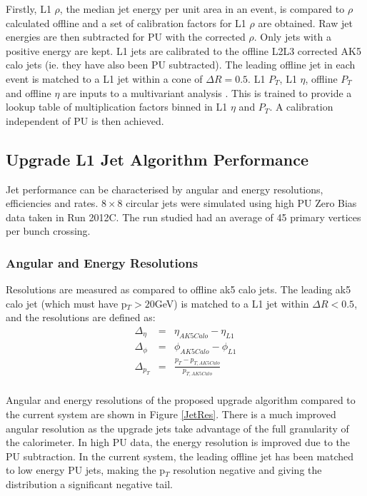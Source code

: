 \begin{itemize}
Firstly, L1 $\rho$, the median jet energy per unit area in an event, is compared to $\rho$ calculated offline 
  and a set of calibration factors for L1 $\rho$ are obtained.
Raw jet energies are then subtracted for PU with the corrected $\rho$. 
Only jets with a positive energy are kept. 
L1 jets are calibrated to the offline L2L3 corrected AK5 calo jets
(ie. they have also been PU subtracted).
The leading offline jet in each event is matched to a L1 jet within a cone of $\Delta R = 0.5$.
L1 $P_{T}$, L1 $\eta$, offline $P_{T}$ and offline $\eta$ are inputs to a multivariant analysis \cite{2007physics...3039H}. 
 This is trained to provide a lookup table of multiplication factors binned in L1 $\eta$ and $P_{T}$. 
 A calibration independent of PU is then achieved. 

\end{itemize}


\subsection{\sc Upgrade L1 Jet Algorithm Performance}
Jet performance can be characterised by angular and energy resolutions, efficiencies and rates. $8\times8$ circular jets were simulated using high PU Zero Bias data taken in Run 2012C. The run studied had an average of 45 primary vertices per bunch crossing.  

\subsubsection{\sc Angular and Energy Resolutions}

Resolutions are measured as compared to offline ak5 calo jets. 
The leading ak5 calo jet (which must have p$_{T} > 20 $GeV) is matched to a L1 jet within $\Delta R < 0.5$, and the resolutions are defined as:
\begin{eqnarray}
\Delta_{\eta} &=& \eta_{AK5Calo} - \eta_{L1} \\
\Delta_{\phi} &=& \phi_{AK5Calo} - \phi_{L1}\\
\Delta_{p_{T}} &=& \frac{ p_{T} -p_{T , AK5Calo} } {p_{T , AK5Calo}} \\
\end{eqnarray}  

Angular and energy resolutions of the proposed upgrade algorithm compared to the current system are shown in Figure \ref{JetRes}.
There is a much improved angular resolution as the upgrade jets take advantage of the full granularity of the calorimeter. In high PU data, the energy resolution is improved due to the PU subtraction. In the current system, the leading offline jet has been matched to low energy PU jets, making the p$_{T}$ resolution negative and giving the distribution a significant negative tail.

